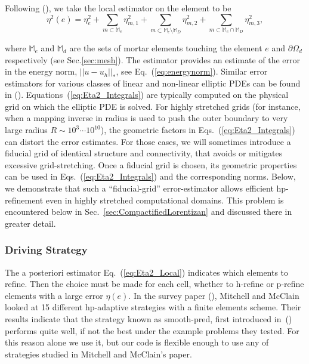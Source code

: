 Following (\citet*{bi2015posteriori}), we take the local estimator on the element to be
%
\begin{equation}
\label{eq:Eta2_Local}
\eta^2(e) =\eta^{2}_{e} + \sum_{m \subset \mathbb{M}_e}\eta^{2}_{m,1} + \sum_{m \subset \mathbb{M}_e\setminus \mathbb{M}_D}\eta^{2}_{m,2} + \sum_{m \subset \mathbb{M}_e \cap \mathbb{M}_D}\eta^{2}_{m,3},
\end{equation}
%

where $\mathbb{M}_e$ and $\mathbb{M}_d$ are the sets of mortar elements touching the element $e$ and  $\partial \Omega_d$ respectively (see Sec.\ref{sec:mesh}). %
The estimator provides an estimate of the error in the energy norm, $ || u - u_h ||_* $, see Eq.~(\ref{eq:energynorm}).  Similar error estimators for various classes of linear and non-linear elliptic PDEs can be found in (\citet*{houstonschotzau05,hansbo2011energy,zhu2011energy,houston2007energy,schotzau.d;zhu.l2009,houstonperugia05,lovadina.c;marini.l2009}).
%
  Equations~(\ref{eq:Eta2_Integrals}) are typically computed on the physical grid on which the elliptic PDE is solved.
  For highly stretched grids (for instance, when a mapping inverse in
  radius is used to push the outer boundary to very large radius
  $R\sim 10^3 \cdots 10^{10}$), the geometric factors in
  Eqs.~(\ref{eq:Eta2_Integrals}) can distort the error estimates.  For
  those cases, we will sometimes introduce a fiducial grid of
  identical structure and connectivity, that avoids or mitigates
  excessive grid-stretching.  Once a fiducial grid is chosen, its geometric properties can be used in Eqs.~(\ref{eq:Eta2_Integrals}) and the corresponding norms.  Below, we demonstrate that such a ``fiducial-grid'' error-estimator allows
  efficient hp-refinement even in highly stretched computational domains.  This problem is encountered below in
Sec.~\ref{sec:CompactifiedLorentizan} and discussed there in greater
detail.

%
\subsubsection{Driving Strategy}

The a posteriori estimator
Eq.~(\ref{eq:Eta2_Local}) indicates which elements to refine.  Then the choice must be made for each cell, whether to h-refine or p-refine elements with a large error $\eta(e)$. In the survey paper (\citet*{mitchell2011survey}), Mitchell and McClain looked at 15 different hp-adaptive strategies with a finite elements scheme. Their results indicate that the strategy known as smooth-pred, first introduced in~(\citet*{melenk2001residual}) performs quite well, if not the best under
the example problems they tested. For this reason alone we use it, but
our code is flexible enough to use any of strategies studied in
Mitchell and McClain's paper.


